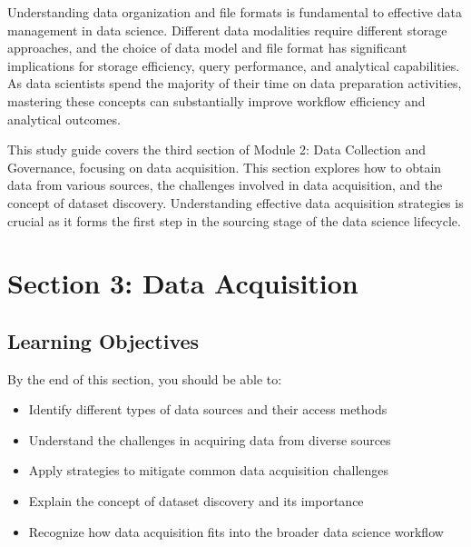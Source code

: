 \documentclass[12pt]{article}
\begin{document}
\begin{tcolorbox}[colback=red!5!white,colframe=red!75!black,title={Key Takeaway}]
Understanding data organization and file formats is fundamental to effective data management in data science. Different data modalities require different storage approaches, and the choice of data model and file format has significant implications for storage efficiency, query performance, and analytical capabilities. As data scientists spend the majority of their time on data preparation activities, mastering these concepts can substantially improve workflow efficiency and analytical outcomes.
\end{tcolorbox}

\newpage

\begin{tcolorbox}[colback=blue!5!white,colframe=blue!75!black,title={Section 3: Data Acquisition}]
This study guide covers the third section of Module 2: Data Collection and Governance, focusing on data acquisition. This section explores how to obtain data from various sources, the challenges involved in data acquisition, and the concept of dataset discovery. Understanding effective data acquisition strategies is crucial as it forms the first step in the sourcing stage of the data science lifecycle.
\end{tcolorbox}

\section{Section 3: Data Acquisition}

\subsection{Learning Objectives}

By the end of this section, you should be able to:

\begin{itemize}
    \item Identify different types of data sources and their access methods
    \item Understand the challenges in acquiring data from diverse sources
    \item Apply strategies to mitigate common data acquisition challenges
    \item Explain the concept of dataset discovery and its importance
    \item Recognize how data acquisition fits into the broader data science workflow
\end{itemize}
\end{document}
